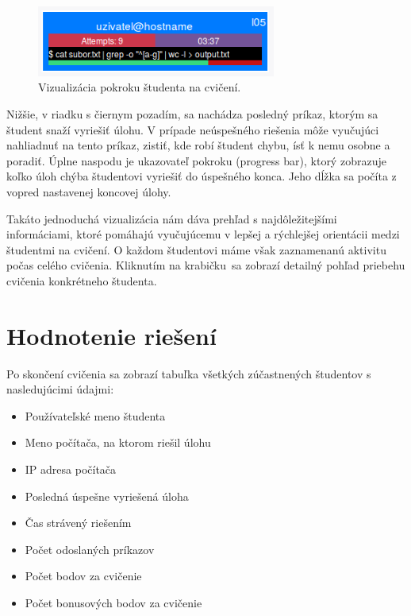 \begin{figure}[h]
	\centerline{\includegraphics[width=0.7\textwidth]{images/gta_monitor_box.png}}
	\caption[Vizualizácia pokroku študenta na cvičení]{Vizualizácia pokroku študenta na cvičení.}
	\label{img:userbox}
\end{figure}

Nižšie, v riadku s čiernym pozadím, sa nachádza posledný príkaz, ktorým sa študent
snaží vyriešiť úlohu. V prípade neúspešného riešenia môže vyučujúci nahliadnuť na
tento príkaz, zistiť, kde robí študent chybu, ísť k nemu osobne a poradiť. Úplne
naspodu je ukazovateľ pokroku (progress bar), ktorý zobrazuje koľko úloh chýba
študentovi vyriešiť do úspešného konca. Jeho dĺžka sa počíta z vopred nastavenej
koncovej úlohy.

Takáto jednoduchá vizualizácia nám dáva prehľad s najdôležitejšími
informáciami, ktoré pomáhajú vyučujúcemu v lepšej a rýchlejšej orientácii medzi
študentmi na cvičení. O každom študentovi máme však zaznamenanú aktivitu počas celého cvičenia.
Kliknutím na \glqq krabičku\grqq ~sa zobrazí detailný pohľad priebehu cvičenia
konkrétneho študenta.

\section{Hodnotenie riešení}
\label{sec:evaluateexercise}

Po skončení cvičenia sa zobrazí tabuľka všetkých zúčastnených študentov s nasledujúcimi
údajmi:

\begin{itemize}
	\item Používateľské meno študenta
	\item Meno počítača, na ktorom riešil úlohu
	\item IP adresa počítača
	\item Posledná úspešne vyriešená úloha
	\item Čas strávený riešením
	\item Počet odoslaných príkazov
	\item Počet bodov za cvičenie
	\item Počet bonusových bodov za cvičenie
\end{itemize}

